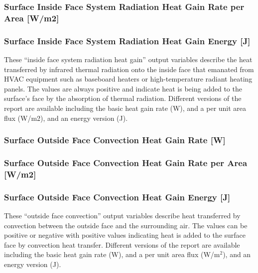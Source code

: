 \subsubsection{Surface Inside Face System Radiation Heat Gain Rate per Area {[}W/m2{]}}\label{surface-inside-face-system-radiation-heat-gain-rate-per-area-wm2}

\subsubsection{Surface Inside Face System Radiation Heat Gain Energy {[}J{]}}\label{surface-inside-face-system-radiation-heat-gain-energy-j}

These ``inside face system radiation heat gain'' output variables describe the heat transferred by infrared thermal radiation onto the inside face that emanated from HVAC equipment such as baseboard heaters or high-temperature radiant heating panels. The values are always positive and indicate heat is being added to the surface's face by the absorption of thermal radiation. Different versions of the report are available including the basic heat gain rate (W), and a per unit area flux (W/m2), and an energy version (J).

\subsubsection{Surface Outside Face Convection Heat Gain Rate {[}W{]}}\label{surface-outside-face-convection-heat-gain-rate-w}

\subsubsection{Surface Outside Face Convection Heat Gain Rate per Area {[}W/m2{]}}\label{surface-outside-face-convection-heat-gain-rate-per-area-wm2}

\subsubsection{Surface Outside Face Convection Heat Gain Energy {[}J{]}}\label{surface-outside-face-convection-heat-gain-energy-j}

These ``outside face convection'' output variables describe heat transferred by convection between the outside face and the surrounding air. The values can be positive or negative with positive values indicating heat is added to the surface face by convection heat transfer. Different versions of the report are available including the basic heat gain rate (W), and a per unit area flux (W/m\(^{2}\)), and an energy version (J).

